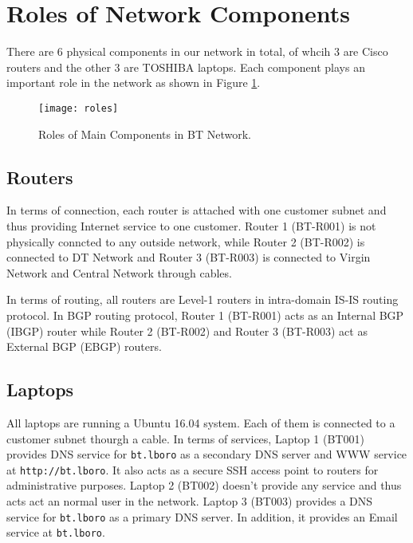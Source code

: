 \section{Roles of Network Components}
\label{sec:components}

There are 6 physical components in our network in total, of whcih 3 are Cisco routers and the other 3 are TOSHIBA laptops. Each component plays an important role in the network as shown in Figure \ref{fig:roles}.

\begin{figure}[t!]
    \centering
    \texttt{[image: roles]}
    \caption{Roles of Main Components in BT Network.}
    \label{fig:roles}
\end{figure}

\subsection{Routers}
In terms of connection, each router is attached with one customer subnet and thus providing Internet service to one customer. Router 1 (BT-R001) is not physically conncted to any outside network, while Router 2 (BT-R002) is connected to DT Network and Router 3 (BT-R003) is connected to Virgin Network and Central Network through cables.

In terms of routing, all routers are Level-1 routers in intra-domain IS-IS routing protocol. In BGP routing protocol, Router 1 (BT-R001) acts as an Internal BGP (IBGP) router while Router 2 (BT-R002) and Router 3 (BT-R003) act as External BGP (EBGP) routers. 



\subsection{Laptops}

All laptops are running a Ubuntu 16.04 system. Each of them is connected to a customer subnet thourgh a cable. 
In terms of services, Laptop 1 (BT001) provides DNS service for \texttt{bt.lboro} as a secondary DNS server and WWW service at \texttt{http://bt.lboro}. It also acts as a secure SSH access point to routers for administrative purposes. 
Laptop 2 (BT002) doesn't provide any service and thus acts act an normal user in the network. 
Laptop 3 (BT003) provides a DNS service for \texttt{bt.lboro} as a primary DNS server. In addition, it provides an Email service at \texttt{bt.lboro}.


